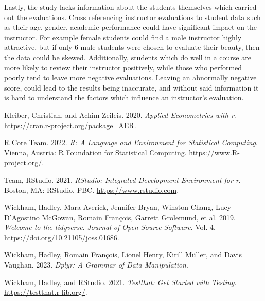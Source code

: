 \documentclass[
  letterpaper,
  DIV=11,
  numbers=noendperiod]{scrartcl}
\newlength{\cslhangindent}
\newlength{\cslentryspacingunit} %
\newenvironment{CSLReferences}[2] %
 {%
  \setlength{\parindent}{0pt}
  \ifodd #1
  \let\oldpar\par
  \def\par{\hangindent=\cslhangindent\oldpar}
  \fi
  \setlength{\parskip}{#2\cslentryspacingunit}
 }%
 {}
\begin{document}
Lastly, the study lacks information about the students themselves which
carried out the evaluations. Cross referencing instructor evaluations to
student data such as their age, gender, academic performance could have
significant impact on the instructor. For example female students could
find a male instructor highly attractive, but if only 6 male students
were chosen to evaluate their beauty, then the data could be skewed.
Additionally, students which do well in a course are more likely to
review their instructor positively, while those who performed poorly
tend to leave more negative evaluations. Leaving an abnormally negative
score, could lead to the results being inaccurate, and without said
information it is hard to understand the factors which influence an
instructor's evaluation.

\hypertarget{refs}{}
\begin{CSLReferences}{1}{0}
\leavevmode{}%
Kleiber, Christian, and Achim Zeileis. 2020. \emph{Applied Econometrics
with r}. \url{https://cran.r-project.org/package=AER}.

\leavevmode{}%
R Core Team. 2022. \emph{R: A Language and Environment for Statistical
Computing}. Vienna, Austria: R Foundation for Statistical Computing.
\url{https://www.R-project.org/}.

\leavevmode{}%
Team, RStudio. 2021. \emph{{RStudio}: Integrated Development Environment
for r}. Boston, MA: RStudio, PBC. \url{https://www.rstudio.com}.

\leavevmode{}%
Wickham, Hadley, Mara Averick, Jennifer Bryan, Winston Chang, Lucy
D'Agostino McGowan, Romain François, Garrett Grolemund, et al. 2019.
\emph{Welcome to the {tidyverse}}. \emph{Journal of Open Source
Software}. Vol. 4. \url{https://doi.org/10.21105/joss.01686}.

\leavevmode{}%
Wickham, Hadley, Romain François, Lionel Henry, Kirill Müller, and Davis
Vaughan. 2023. \emph{Dplyr: A Grammar of Data Manipulation}.

\leavevmode{}%
Wickham, Hadley, and RStudio. 2021. \emph{Testthat: Get Started with
Testing}. \url{https://testthat.r-lib.org/}.

\end{CSLReferences}
\end{document}

